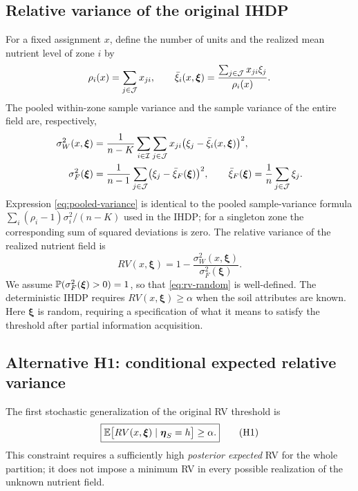 \subsection{Relative variance of the original IHDP}
\label{subsec:rv-definition}

For a fixed assignment $x$, define the number of units and the realized
mean nutrient level of zone $i$ by
\begin{equation}
 \rho_i(x)=\sum_{j\in\mathcal{J}}x_{ji},\qquad
 \bar\xi_i(x,\boldsymbol\xi)
   =\frac{\sum_{j\in\mathcal{J}}x_{ji}\xi_j}{\rho_i(x)}.
 \label{eq:zone-mean}
\end{equation}
The pooled within-zone sample variance and the sample variance of the
entire field are, respectively,
\begin{align}
 \sigma_W^2(x,\boldsymbol\xi)
   &=\frac{1}{n-K}\sum_{i\in\mathcal{I}}\sum_{j\in\mathcal{J}}
        x_{ji}\bigl(\xi_j-\bar\xi_i(x,\boldsymbol\xi)\bigr)^2,
    \label{eq:pooled-variance}\\
 \sigma_F^2(\boldsymbol\xi)
   &=\frac{1}{n-1}\sum_{j\in\mathcal{J}}
       \bigl(\xi_j-\bar\xi_F(\boldsymbol\xi)\bigr)^2,
    \qquad
 \bar\xi_F(\boldsymbol\xi)=\frac1n\sum_{j\in\mathcal{J}}\xi_j.
    \label{eq:field-variance}
\end{align}
Expression \eqref{eq:pooled-variance} is identical to the pooled
sample-variance formula
$\sum_i(\rho_i-1)\sigma_i^2/(n-K)$ used in the IHDP;
for a singleton zone the corresponding sum of squared deviations is
zero. The relative variance of the realized nutrient field is
\begin{equation}
 \boxed{\displaystyle
 RV(x,\boldsymbol\xi)
    =1-\frac{\sigma_W^2(x,\boldsymbol\xi)}
             {\sigma_F^2(\boldsymbol\xi)}.}
 \label{eq:rv-random}
\end{equation}
We assume $\mathbb{P}(\sigma_F^2(\boldsymbol\xi)>0)=1$, so that
\eqref{eq:rv-random} is well-defined. The deterministic IHDP requires
$RV(x,\boldsymbol\xi)\geq\alpha$ when the soil attributes are known.
Here $\boldsymbol\xi$ is random, requiring a specification of what it
means to satisfy the threshold after partial information acquisition.

\subsection{Alternative H1: conditional expected relative variance}
\label{subsec:homogeneity-h1}

The first stochastic generalization of the original RV threshold is
\begin{equation}
 \boxed{\displaystyle
 \mathbb{E}\bigl[RV(x,\boldsymbol\xi)
          \mid\boldsymbol\eta_S=h\bigr]\geq\alpha.}
 \tag{H1}\label{eq:H1}
\end{equation}
This constraint requires a sufficiently high \emph{posterior expected}
RV for the whole partition; it does not impose a minimum RV in every
possible realization of the unknown nutrient field.


